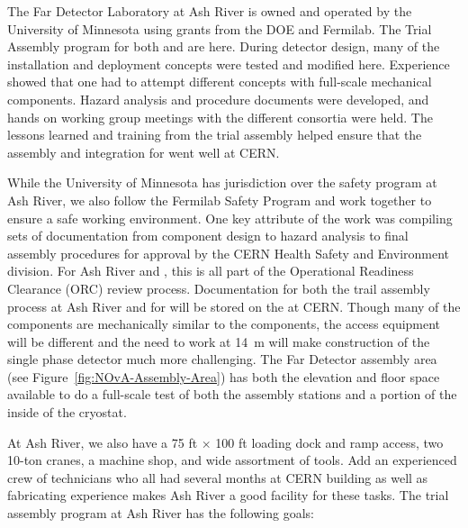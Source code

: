 The \nova Far Detector Laboratory at Ash River is owned and operated by the University of Minnesota using grants from the DOE and Fermilab. The Trial Assembly program for both  and  are here. During  detector design, many of the installation and deployment concepts were tested and modified here. Experience showed that one had to attempt different concepts with full-scale mechanical components. Hazard analysis and procedure documents were developed, and hands on working group meetings with the different consortia were held.  The lessons learned and training from the trial assembly helped ensure that the assembly and integration for  went well at CERN.

While the University of Minnesota has jurisdiction over the safety program at Ash River, we also follow the Fermilab Safety Program and work together to ensure a safe working environment.  
One key attribute of the  work was compiling sets of documentation from component design to hazard analysis to final assembly procedures for approval by the CERN Health Safety and Environment division. 
For Ash River and , this is all part of the Operational Readiness Clearance (ORC) review process. 
Documentation for both the trail assembly process at Ash River and for  will be stored on the  at CERN. 
Though many of the  components are mechanically similar to the  components, the access equipment will be different and the need to work at \SI{14}{m} will make construction of the  single phase detector much more challenging.  
The \nova Far Detector assembly area (see Figure~\ref{fig:NOvA-Assembly-Area}) has both the elevation and floor space available to do a full-scale test of both the assembly stations and a portion of the inside of the  cryostat. 


At Ash River, we also have a 75 \si{ft} $\times$  100 \si{ft} loading dock and ramp access, two 10-ton cranes, a machine shop, and wide assortment of tools.  Add an experienced crew of technicians who all had several months at CERN building  as well as fabricating experience makes Ash River a good facility for these tasks. 
The   trial assembly program at Ash River has the following goals:

